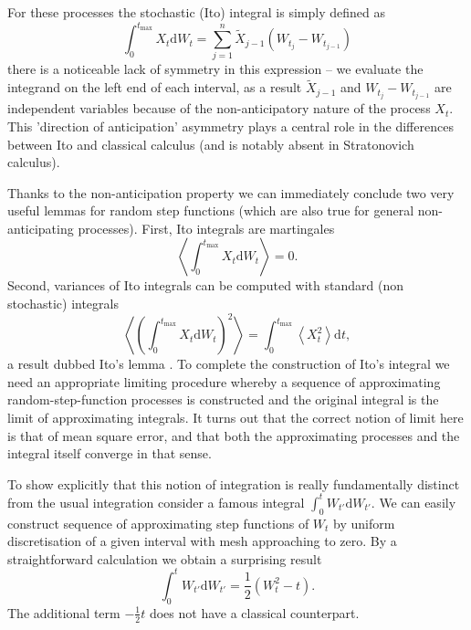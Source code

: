 \documentclass{doctoral}
\newcommand{\dd}{\mathrm{d}}
\begin{document}
For these processes the stochastic (Ito) integral is simply defined as
\begin{equation}
    \int_0^{t_{\mathrm{max}}} X_t \dd W_t = \sum_{j=1}^{n} \widetilde{X}_{j-1} (W_{t_j} - W_{t_{j-1}}) \label{eqn:ito-integral-step-function}
\end{equation}
there is a noticeable lack of symmetry in this expression -- we evaluate the integrand on the left end of each interval, as a result $\widetilde{X}_{j-1}$ and $W_{t_j} - W_{t_{j-1}}$ are independent variables because of the non-anticipatory nature of the process $X_t$.
This 'direction of anticipation' asymmetry plays a central role in the differences between Ito and classical calculus (and is notably absent in Stratonovich calculus).

Thanks to the non-anticipation property we can immediately conclude two very useful lemmas for random step functions (which are also true for general non-anticipating processes).
First, Ito integrals are martingales
\begin{equation}
    \left< \int_0^{t_{\mathrm{max}}} X_t \dd W_t \right> = 0.
    \label{eqn:ito-integrals-are-martingales}
\end{equation}
Second, variances of Ito integrals can be computed with standard (non stochastic) integrals
\begin{equation}
    \left< \left( \int_0^{t_{\mathrm{max}}} X_t \dd W_t \right)^2 \right> = \int_{0}^{t_{\mathrm{max}}} \left< X_t^2 \right> \dd t, \label{eqn:itos-lemma}
\end{equation}
a result dubbed Ito's lemma \cite{Ito_1951}.
To complete the construction of Ito's integral we need an appropriate limiting procedure whereby a sequence of approximating random-step-function processes is constructed and the original integral is the limit of approximating integrals.
It turns out that the correct notion of limit here is that of mean square error, and that both the approximating processes and the integral itself converge in that sense.

To show explicitly that this notion of integration is really fundamentally distinct from the usual integration consider a famous integral $\int_0^t W_{t'} \dd W_{t'}$.
We can easily construct sequence of approximating step functions of $W_{t}$ by uniform discretisation of a given interval with mesh approaching to zero.
By a straightforward calculation we obtain a surprising result
\begin{equation}
    \int_{0}^{t} W_{t'} \dd W_{t'} = \frac{1}{2} \left( W_t^2 - t \right).
    \label{eqn:celebrated-integral}
\end{equation}
The additional term $-\frac{1}{2}t$ does not have a classical counterpart.
\end{document}
